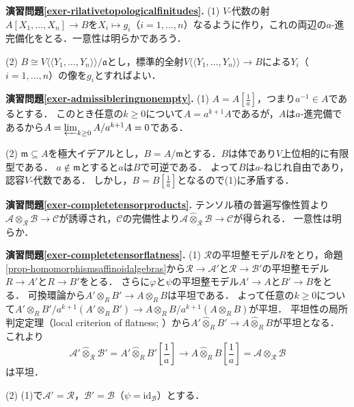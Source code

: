 \documentclass[a4paper,12pt, dvipdfmx]{jsbook}
\def\m{\mathfrak{m}}
\def\id{\mathrm{id}}
\def\dl{\langle\!\langle}
\def\dr{\rangle\!\rangle}
\theoremstyle{plain}
\theoremstyle{definition}
\begin{document}
{\medskip\noindent
{\bf 演習問題\ref{exer-rilativetopologicalfinitudes}.}
(1) $V$-代数の射$A[X_1,\ldots,X_n]\rightarrow B$を$X_i\mapsto g_i$（$i=1,\ldots,n$）なるように作り，これの両辺の$a$-進完備化をとる．一意性は明らかであろう．

(2) $B\cong V\dl Y_1,\ldots,Y_n\dr/\mathfrak{a}$とし，標準的全射$V\dl Y_1,\ldots,Y_n\dr\rightarrow B$による$Y_i$（$i=1,\ldots,n$）の像を$g_i$とすればよい．

\noindent
{\bf 演習問題\ref{exer-admissibleringnonempty}.}
(1) $A=A[\frac{1}{a}]$，つまり$a^{-1}\in A$であるとする．
このとき任意の$k\geq 0$について$A=a^{k+1}A$であるが，$A$は$a$-進完備であるから$A=\varprojlim_{k\geq 0}A/a^{k+1}A=0$である．

(2) $\m\subseteq A$を極大イデアルとし，$B=A/\m$とする．$B$は体であり$V$上位相的に有限型である．
$a\not\in\m$とすると$a$は$B$で可逆である．
よって$B$は$a$-ねじれ自由であり，認容$V$-代数である．
しかし，$B=B[\frac{1}{a}]$となるので(1)に矛盾する．

\medskip\noindent
{\bf 演習問題\ref{exer-completetensorproducts}.}
テンソル積の普遍写像性質より$\mathcal{A}\otimes_{\mathcal{R}}\mathcal{B}\rightarrow\mathcal{C}$が誘導され，$\mathcal{C}$の完備性より$\mathcal{A}\widehat{\otimes}_{\mathcal{R}}\mathcal{B}\rightarrow\mathcal{C}$が得られる．
一意性は明らか．

\medskip\noindent
{\bf 演習問題\ref{exer-completetensorflatness}.}
(1) $\mathcal{R}$の平坦整モデル$R$をとり，命題\ref{prop-homomorphismsaffinoidalgebras}から$\mathcal{R}\rightarrow\mathcal{A}'$と$\mathcal{R}\rightarrow\mathcal{B}'$の平坦整モデル$R\rightarrow A'$と$R\rightarrow B'$をとる．
さらに$\varphi$と$\psi$の平坦整モデル$A'\rightarrow A$と$B'\rightarrow B$をとる．
可換環論から$A'\otimes_RB'\rightarrow A\otimes_RB$は平坦である．
よって任意の$k\geq 0$について$A'\otimes_RB'/a^{k+1}(A'\otimes_RB')\rightarrow A\otimes_RB/a^{k+1}(A\otimes_RB)$が平坦．
平坦性の局所判定定理（local criterion of flatness; \cite[Theorem 22.3]{Matsu}）から$A'\widehat{\otimes}_RB'\rightarrow A\widehat{\otimes}_RB$が平坦となる．
これより
$$
{\textstyle \mathcal{A}'\widehat{\otimes}_{\mathcal{R}}\mathcal{B}'=A'\widehat{\otimes}_RB'[\frac{1}{a}]\longrightarrow A\widehat{\otimes}_RB[\frac{1}{a}]=\mathcal{A}\widehat{\otimes}_{\mathcal{R}}\mathcal{B}}
$$
は平坦．

(2) (1)で$\mathcal{A}'=\mathcal{R}$，$\mathcal{B}'=\mathcal{B}$（$\psi=\id_{\mathcal{B}}$）とする．






}
\end{document}
